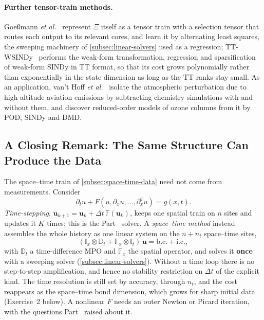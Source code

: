 \paragraph{Further tensor-train methods.}
Goe\ss{}mann \emph{et al.}~\cite{Goessmann2020} represent $\Xi$ itself as a
tensor train with a selection tensor that routes each output to its relevant
cores, and learn it by alternating least squares, the sweeping machinery of
\cref{subsec:linear-solvers} used as a regression; TT-WSINDy~\cite{Houser2026}
performs the weak-form transformation, regression and sparsification of
weak-form SINDy in TT format, so that its cost grows polynomially rather than
exponentially in the state dimension as long as the TT ranks stay small. As an
application, van't Hoff \emph{et al.}~\cite{vantHoff2026} isolate the
atmospheric perturbation due to high-altitude aviation emissions by subtracting
chemistry simulations with and without them, and discover reduced-order models
of ozone columns from it by POD, SINDy and DMD.

\subsection{A Closing Remark: The Same Structure Can Produce the Data}
\label{subsec:dmd-space-time}

The space--time train of \cref{subsec:space-time-data} need not come from
measurements. Consider
\begin{equation}
  \partial_t u + F(u, \partial_x u, \dots, \partial_x^q u) = g(x,t) .
  \label{eq:generic-evolution}
\end{equation}%
\emph{Time-stepping}, $\mathbf u_{k+1} = \mathbf u_k + \Delta t\,
\mathbb F(\mathbf u_k)$, keeps one spatial train on $n$ sites and updates it
$K$ times; this is the Part~ solver. A \emph{space--time method}
instead assembles the whole history as one linear system on the $n+n_t$
space--time sites,
\begin{equation}
  (\mathbb I_x \otimes \mathbb D_t + \mathbb F_x \otimes \mathbb I_t)\,
  \mathbf u = \text{b.c.} + \text{i.c.},
  \label{eq:space-time-system}
\end{equation}%
with $\mathbb D_t$ a time-difference MPO and $\mathbb F_x$ the spatial
operator, and solves it \textbf{once} with a sweeping solver
(\cref{subsec:linear-solvers}). Without a time loop there is no step-to-step
amplification, and hence no stability restriction on $\Delta t$ of the explicit
kind. The time resolution is still set by accuracy, through $n_t$, and the
cost reappears as the space--time bond dimension, which grows for sharp initial
data (Exercise~2 below). A nonlinear $F$ needs an outer Newton or Picard
iteration, with the questions Part~ raised about it.

